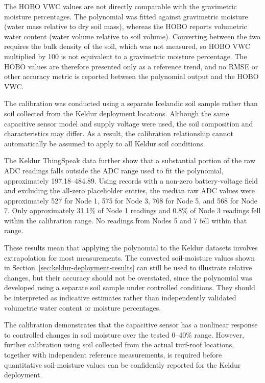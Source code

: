 The HOBO VWC values are not directly comparable with the gravimetric moisture percentages. The polynomial was fitted against gravimetric moisture (water mass relative to dry soil mass), whereas the HOBO reports volumetric water content (water volume relative to soil volume). Converting between the two requires the bulk density of the soil, which was not measured, so HOBO VWC multiplied by 100 is not equivalent to a gravimetric moisture percentage. The HOBO values are therefore presented only as a reference trend, and no RMSE or other accuracy metric is reported between the polynomial output and the HOBO VWC.

The calibration was conducted using a separate Icelandic soil sample rather than soil collected from the Keldur deployment locations. Although the same capacitive sensor model and supply voltage were used, the soil composition and characteristics may differ. As a result, the calibration relationship cannot automatically be assumed to apply to all Keldur soil conditions.

The Keldur ThingSpeak data further show that a substantial portion of the raw ADC readings falls outside the ADC range used to fit the polynomial, approximately 197.18--484.89. Using records with a non-zero battery-voltage field and excluding the all-zero placeholder entries, the median raw ADC values were approximately 527 for Node 1, 575 for Node 3, 768 for Node 5, and 568 for Node 7. Only approximately 31.1\% of Node 1 readings and 0.8\% of Node 3 readings fell within the calibration range. No readings from Nodes 5 and 7 fell within that range.

These results mean that applying the polynomial to the Keldur datasets involves extrapolation for most measurements. The converted soil-moisture values shown in Section~\ref{sec:keldur-deployment-results} can still be used to illustrate relative changes, but their accuracy should not be overstated, since the polynomial was developed using a separate soil sample under controlled conditions. They should be interpreted as indicative estimates rather than independently validated volumetric water content or moisture percentages.

The calibration demonstrates that the capacitive sensor has a nonlinear response to controlled changes in soil moisture over the tested 0--40\% range. However, further calibration using soil collected from the actual turf-roof locations, together with independent reference measurements, is required before quantitative soil-moisture values can be confidently reported for the Keldur deployment.

